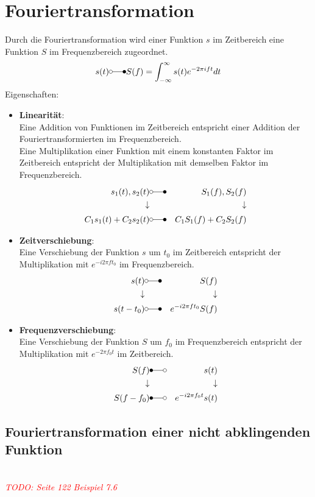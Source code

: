\documentclass[12pt]{article}
\newcommand\todo[1]{\textit{\textcolor{red}{\\TODO: #1}}}
\begin{document}
\section{Fouriertransformation}
Durch die Fouriertransformation wird einer Funktion $s$ im Zeitbereich eine Funktion $S$ im Frequenzbereich zugeordnet.
\begin{equation*}
	s(t)\laplace S(f)=\int_{-\infty}^\infty s(t)e^{-2\pi ift}dt
\end{equation*}
Eigenschaften:
\begin{itemize}
	\item \textbf{Linearität}:\\
			Eine Addition von Funktionen im Zeitbereich entspricht einer Addition der Fouriertransformierten im Frequenzbereich.\\
			Eine Multiplikation einer Funktion mit einem konstanten Faktor im Zeitbereich entspricht der Multiplikation mit demselben Faktor im Frequenzbereich.
			\begin{eqnarray*}
				s_1(t),s_2(t) & \laplace & S_1(f),S_2(f)\\
				\downarrow & & \downarrow \\
				C_1s_1(t)+C_2s_2(t) & \laplace & C_1S_1(f)+C_2S_2(f)
			\end{eqnarray*}
	\item \textbf{Zeitverschiebung}:\\
			Eine Verschiebung der Funktion $s$ um $t_0$ im Zeitbereich entspricht der Multiplikation mit $e^{-i2\pi ft_0}$ im Frequenzbereich.
			\begin{eqnarray*}
				s(t) & \laplace & S(f)\\
				\downarrow & & \downarrow \\
				s(t-t_0) & \laplace & e^{-i2\pi ft_0}S(f)
			\end{eqnarray*}
	\item \textbf{Frequenzverschiebung}:\\
			Eine Verschiebung der Funktion $S$ um $f_0$ im Frequenzbereich entspricht der Multiplikation mit $e^{-2\pi f_0 t}$ im Zeitbereich.
			\begin{eqnarray*}
				S(f) & \Laplace & s(t)\\
				\downarrow & & \downarrow \\
				S(f-f_0) & \Laplace & e^{-i2\pi f_0t}s(t)
			\end{eqnarray*}
\end{itemize}
\subsection{Fouriertransformation einer nicht abklingenden Funktion}
\todo{Seite 122 Beispiel 7.6}
\end{document}
